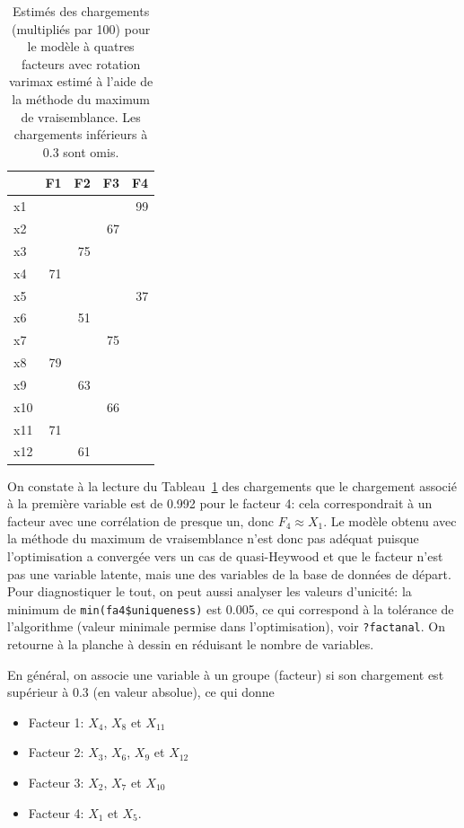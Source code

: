 \documentclass[
  11pt,
  letterpaper,
]{scrbook}
\providecommand{\tightlist}{%
  \setlength{\itemsep}{0pt}\setlength{\parskip}{0pt}}\usepackage{longtable,booktabs,array}
\theoremstyle{definition}
\theoremstyle{remark}
\begin{document}
\hypertarget{tbl-factanal4}{}
\begin{table}
\caption{\label{tbl-factanal4}Estimés des chargements (multipliés par 100) pour le modèle à quatres
facteurs avec rotation varimax estimé à l'aide de la méthode du maximum
de vraisemblance. Les chargements inférieurs à 0.3 sont omis. }\tabularnewline

\centering
\begin{tabular}{lrrrr}
\toprule
  & F1 & F2 & F3 & F4\\
\midrule
x1 &  &  &  & 99\\
x2 &  &  & 67 & \\
x3 &  & 75 &  & \\
x4 & 71 &  &  & \\
x5 &  &  &  & 37\\
\addlinespace
x6 &  & 51 &  & \\
x7 &  &  & 75 & \\
x8 & 79 &  &  & \\
x9 &  & 63 &  & \\
x10 &  &  & 66 & \\
\addlinespace
x11 & 71 &  &  & \\
x12 &  & 61 &  & \\
\bottomrule
\end{tabular}
\end{table}

On constate à la lecture du Tableau~\ref{tbl-factanal4} des chargements
que le chargement associé à la première variable est de 0.992 pour le
facteur 4: cela correspondrait à un facteur avec une corrélation de
presque un, donc \(F_4 \approx X_1\). Le modèle obtenu avec la méthode
du maximum de vraisemblance n'est donc pas adéquat puisque
l'optimisation a convergée vers un cas de quasi-Heywood et que le
facteur n'est pas une variable latente, mais une des variables de la
base de données de départ. Pour diagnostiquer le tout, on peut aussi
analyser les valeurs d'unicité: la minimum de
\texttt{min(fa4\$uniqueness)} est 0.005, ce qui correspond à la
tolérance de l'algorithme (valeur minimale permise dans l'optimisation),
voir \texttt{?factanal}. On retourne à la planche à dessin en réduisant
le nombre de variables.

En général, on associe une variable à un groupe (facteur) si son
chargement est supérieur à 0.3 (en valeur absolue), ce qui donne

\begin{itemize}
\tightlist
\item
  Facteur 1: \(X_4\), \(X_8\) et \(X_{11}\)
\item
  Facteur 2: \(X_3\), \(X_6\), \(X_9\) et \(X_{12}\)
\item
  Facteur 3: \(X_2\), \(X_7\) et \(X_{10}\)
\item
  Facteur 4: \(X_1\) et \(X_5\).
\end{itemize}
\end{document}
